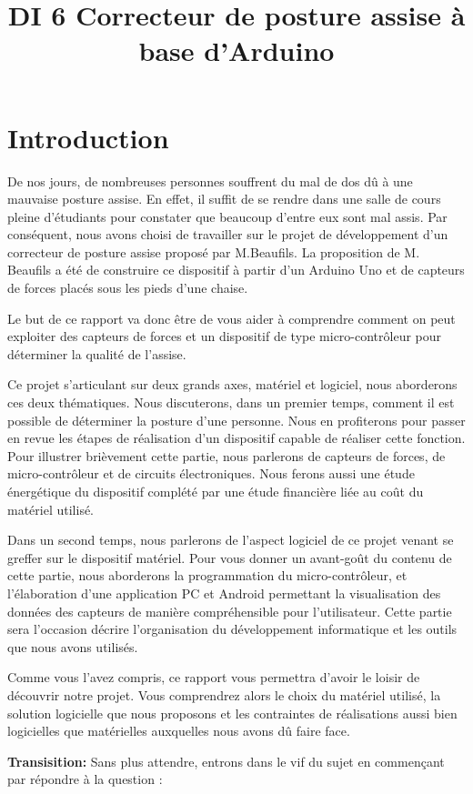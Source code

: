 \documentclass{polytech/polytech}
\title{DI 6 Correcteur de posture assise à base d'Arduino}
\begin{document}
\chapter*{Introduction}

De nos jours, de nombreuses personnes souffrent du mal de dos dû à une mauvaise posture assise.
En effet, il suffit de se rendre dans une salle de cours pleine d'étudiants pour constater que beaucoup d'entre eux sont mal assis.
Par conséquent, nous avons choisi de travailler sur le projet de développement d'un correcteur de posture assise proposé par M.Beaufils.
La proposition de M. Beaufils a été de construire ce dispositif à partir d'un Arduino Uno et de capteurs de forces placés sous les pieds d'une chaise. 

Le but de ce rapport va donc être de vous aider à comprendre comment on peut exploiter des capteurs de forces et un dispositif de type micro-contrôleur pour déterminer la qualité de l'assise. 

Ce projet s'articulant sur deux grands axes, matériel et logiciel, nous aborderons ces deux thématiques.
Nous discuterons, dans un premier temps, comment il est possible de déterminer la posture d'une personne.
Nous en profiterons pour passer en revue les étapes de réalisation d'un dispositif capable de réaliser cette fonction.
Pour illustrer brièvement cette partie, nous parlerons de capteurs de forces, de micro-contrôleur et de circuits électroniques.
Nous ferons aussi une étude énergétique du dispositif complété par une étude financière liée au coût du matériel utilisé.

Dans un second temps, nous parlerons de l'aspect logiciel de ce projet venant se greffer sur le dispositif matériel. 
Pour vous donner un avant-goût du contenu de cette partie, nous aborderons la programmation du micro-contrôleur, et l'élaboration d'une application PC et Android permettant la visualisation des données des capteurs de manière compréhensible pour l'utilisateur.
Cette partie sera l'occasion décrire l'organisation du développement informatique et les outils que nous avons utilisés.

Comme vous l'avez compris, ce rapport vous permettra d'avoir le loisir de découvrir notre projet.
 Vous comprendrez alors le choix du matériel utilisé, la solution logicielle que nous proposons et les contraintes de réalisations aussi bien logicielles que matérielles auxquelles nous avons dû faire face.


\textbf{Transisition:} Sans plus attendre, entrons dans le vif du sujet en commençant par répondre à la question :
\end{document}
